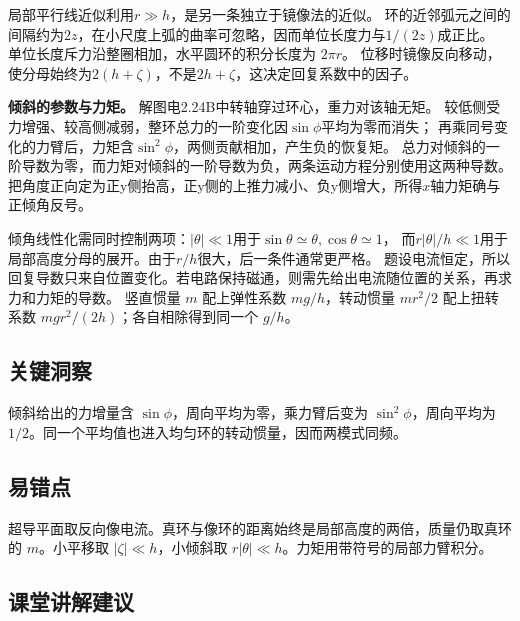 \documentclass[UTF8,fontset=fandol,a4paper,11pt]{ctexart}
\begin{document}
局部平行线近似利用$r\gg h$，是另一条独立于镜像法的近似。
环的近邻弧元之间的间隔约为$2z$，在小尺度上弧的曲率可忽略，因而单位长度力与$1/(2z)$成正比。
单位长度斥力沿整圈相加，水平圆环的积分长度为 $2\pi r$。
位移时镜像反向移动，使分母始终为$2(h+\zeta)$，不是$2h+\zeta$，这决定回复系数中的因子。

\textbf{倾斜的参数与力矩。} 解图电2.24B中转轴穿过环心，重力对该轴无矩。
较低侧受力增强、较高侧减弱，整环总力的一阶变化因$\sin\phi$平均为零而消失；
再乘同号变化的力臂后，力矩含$\sin^2\phi$，两侧贡献相加，产生负的恢复矩。
总力对倾斜的一阶导数为零，而力矩对倾斜的一阶导数为负，两条运动方程分别使用这两种导数。
把角度正向定为正y侧抬高，正y侧的上推力减小、负y侧增大，所得$x$轴力矩确与正倾角反号。

倾角线性化需同时控制两项：$|\theta|\ll1$用于$\sin\theta\simeq\theta,\cos\theta\simeq1$，
而$r|\theta|/h\ll1$用于局部高度分母的展开。由于$r/h$很大，后一条件通常更严格。
题设电流恒定，所以回复导数只来自位置变化。若电路保持磁通，则需先给出电流随位置的关系，再求力和力矩的导数。
竖直惯量 $m$ 配上弹性系数 $mg/h$，转动惯量 $mr^2/2$ 配上扭转系数 $mgr^2/(2h)$；各自相除得到同一个 $g/h$。




\subsection*{关键洞察}

倾斜给出的力增量含 $\sin\phi$，周向平均为零，乘力臂后变为 $\sin^2\phi$，周向平均为 $1/2$。同一个平均值也进入均匀环的转动惯量，因而两模式同频。



\subsection*{易错点}

超导平面取反向像电流。真环与像环的距离始终是局部高度的两倍，质量仍取真环的 $m$。小平移取 $|\zeta|\ll h$，小倾斜取 $r|\theta|\ll h$。力矩用带符号的局部力臂积分。



\subsection*{课堂讲解建议}
\end{document}
